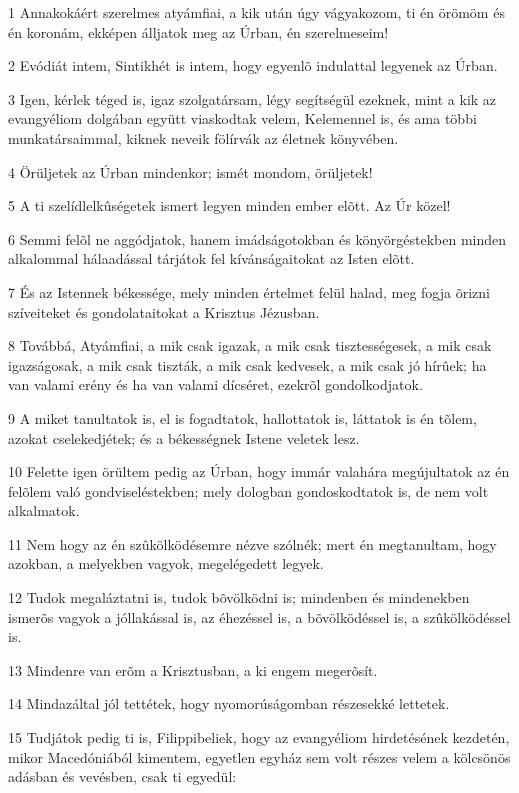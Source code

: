 \par 1 Annakokáért szerelmes atyámfiai, a kik után úgy vágyakozom, ti én örömöm és én koronám, ekképen álljatok meg az Úrban, én szerelmeseim!
\par 2 Evódiát intem, Sintikhét is intem, hogy egyenlõ indulattal legyenek az Úrban.
\par 3 Igen, kérlek téged is, igaz szolgatársam, légy segítségül ezeknek, mint a kik az evangyéliom dolgában együtt viaskodtak velem, Kelemennel is, és ama többi munkatársaimmal, kiknek neveik fölírvák az életnek könyvében.
\par 4 Örüljetek az Úrban mindenkor; ismét mondom, örüljetek!
\par 5 A ti szelídlelkûségetek ismert legyen minden ember elõtt. Az Úr közel!
\par 6 Semmi felõl ne aggódjatok, hanem imádságotokban és könyörgéstekben minden alkalommal hálaadással tárjátok fel kívánságaitokat az Isten elõtt.
\par 7 És az Istennek békessége, mely minden értelmet felül halad, meg fogja õrizni szíveiteket és gondolataitokat a Krisztus Jézusban.
\par 8 Továbbá, Atyámfiai, a mik csak igazak, a mik csak tisztességesek, a mik csak igazságosak, a mik csak tiszták, a mik csak kedvesek, a mik csak jó hírûek; ha van valami erény és ha van valami dícséret, ezekrõl gondolkodjatok.
\par 9 A miket tanultatok is, el is fogadtatok, hallottatok is, láttatok is én tõlem, azokat cselekedjétek; és a békességnek Istene veletek lesz.
\par 10 Felette igen örültem pedig az Úrban, hogy immár valahára megújultatok az én felõlem való gondviseléstekben; mely dologban gondoskodtatok is, de nem volt alkalmatok.
\par 11 Nem hogy az én szûkölködésemre nézve szólnék; mert én megtanultam, hogy azokban, a melyekben vagyok, megelégedett legyek.
\par 12 Tudok megaláztatni is, tudok bõvölködni is; mindenben és mindenekben ismerõs vagyok a jóllakással is, az éhezéssel is, a bõvölködéssel is, a szûkölködéssel is.
\par 13 Mindenre van erõm a Krisztusban, a ki engem megerõsít.
\par 14 Mindazáltal jól tettétek, hogy nyomorúságomban részesekké lettetek.
\par 15 Tudjátok pedig ti is, Filippibeliek, hogy az evangyéliom hirdetésének kezdetén, mikor Macedóniából kimentem, egyetlen egyház sem volt részes velem a kölcsönös adásban és vevésben, csak ti egyedül:
